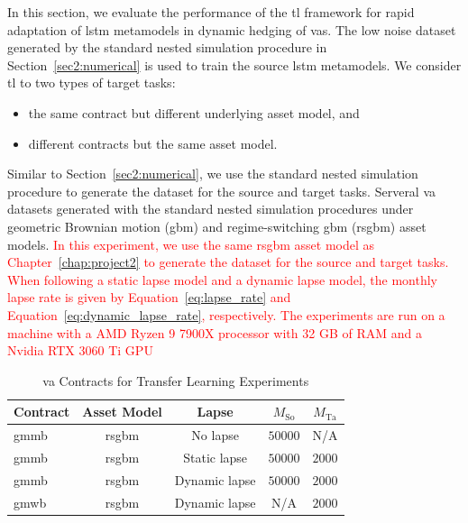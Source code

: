 In this section, we evaluate the performance of the \gls{tl} framework for rapid adaptation of \gls{lstm} metamodels in dynamic hedging of \gls{va}s.
The low noise dataset generated by the standard nested simulation procedure in Section~\ref{sec2:numerical} is used to train the source \gls{lstm} metamodels.
We consider \gls{tl} to two types of target tasks: 
\begin{itemize}
    \item the same contract but different underlying asset model, and
    \item different contracts but the same asset model.
\end{itemize}  
Similar to Section~\ref{sec2:numerical}, we use the standard nested simulation procedure to generate the dataset for the source and target tasks.
Serveral \gls{va} datasets generated with the standard nested simulation procedures under geometric Brownian motion (\gls{gbm}) and regime-switching \gls{gbm} (\gls{rsgbm}) asset models.
\textcolor{red}{In this experiment, we use the same \gls{rsgbm} asset model as Chapter~\ref{chap:project2} to generate the dataset for the source and target tasks.}
\textcolor{red}{When following a static lapse model and a dynamic lapse model, the monthly lapse rate is given by Equation~\ref{eq:lapse_rate} and Equation~\ref{eq:dynamic_lapse_rate}, respectively.}
\textcolor{red}{The experiments are run on a machine with a AMD Ryzen 9 7900X processor with 32 GB of RAM and a Nvidia RTX $\num{3060}$ Ti GPU}

\begin{table}[ht!] 
    \centering
    \begin{tabular}{lcccc} 
    \toprule
    \textbf{Contract} & \textbf{Asset Model} & \textbf{Lapse} & \textbf{$M_{\text{So}}$}  & \textbf{$M_{\text{Ta}}$}\\
    \midrule
    \gls{gmmb} & \gls{rsgbm} & No lapse & $\num{50000}$ & N/A \\
    \gls{gmmb} & \gls{rsgbm} & Static lapse & $\num{50000}$ & $\num{2000}$ \\
    \gls{gmmb} & \gls{rsgbm} & Dynamic lapse & $\num{50000}$ & $\num{2000}$ \\
    \gls{gmwb} & \gls{rsgbm} & Dynamic lapse & N/A & $\num{2000}$ \\
    \bottomrule
    \end{tabular}
    \caption{\gls{va} Contracts for Transfer Learning Experiments}
    \label{tab3:contracts}
\end{table}

